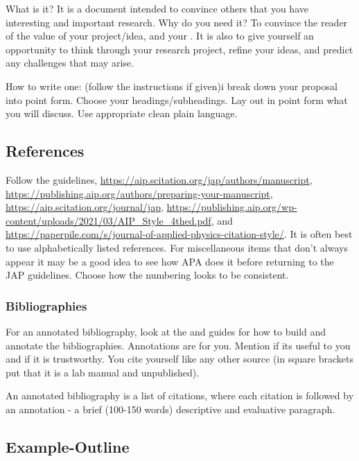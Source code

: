 \documentclass[12pt, a4paper, oneside, openright, titlepage]{book}
\begin{document}
\begin{appendices}
    What is it? It is a document intended to convince others that you have interesting and important research. Why do you need it? To convince the reader of the value of your project/idea, and your . It is also to give yourself an opportunity to think through your research project, refine your ideas, and predict any challenges that may arise.

    How to write one: (follow the instructions if given)i break down your proposal into point form. Choose your headings/subheadings. Lay out in point form what you will discuss. Use appropriate clean plain language.

    \subsection{References}

    Follow the  guidelines, \url{https://aip.scitation.org/jap/authors/manuscript}, \url{https://publishing.aip.org/authors/preparing-your-manuscript}, \url{https://aip.scitation.org/journal/jap}, \url{https://publishing.aip.org/wp-content/uploads/2021/03/AIP_Style_4thed.pdf}, and \url{https://paperpile.com/s/journal-of-applied-physics-citation-style/}. It is often best to use alphabetically listed references. For miscellaneous items that don't always appear it may be a good idea to see how APA does it before returning to the JAP guidelines. Choose how the numbering looks to be consistent.

    \subsubsection{Bibliographies}

    For an annotated bibliography, look at the  and  guides for how to build and annotate the bibliographies. Annotations are for you. Mention if its useful to you and if it is trustworthy. You cite yourself like any other source (in square brackets put that it is a lab manual and unpublished). 

    An annotated bibliography is a list of citations, where each citation is followed by an annotation - a brief (100-150 words) descriptive and evaluative paragraph. 


    \subsection{Example-Outline}


\end{appendices}
\end{document}
